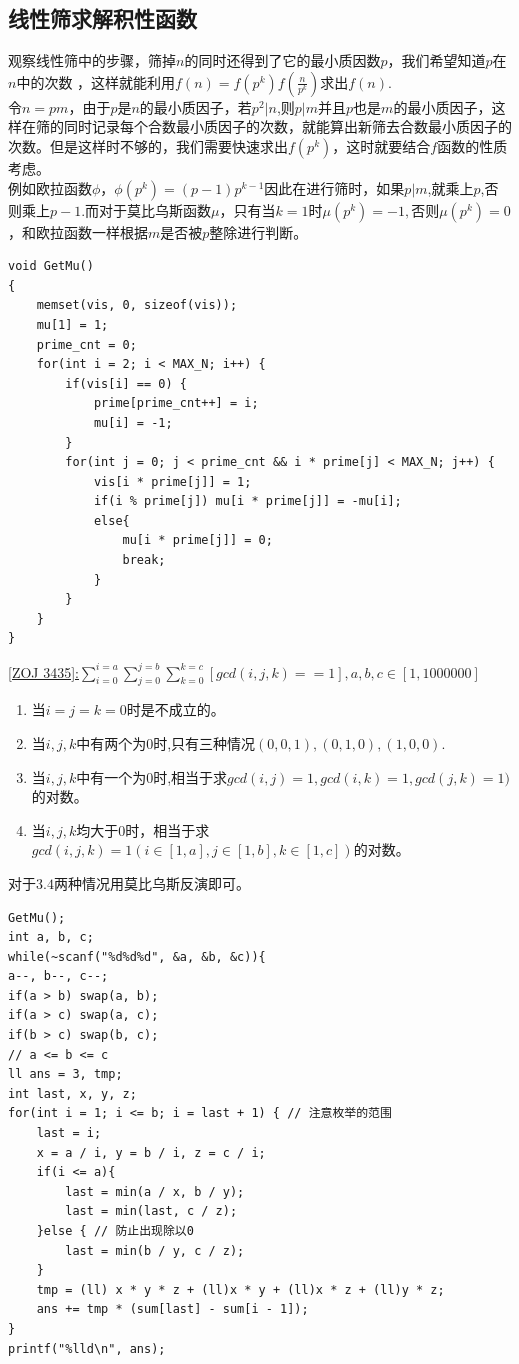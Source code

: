 \subsection{线性筛求解积性函数}
观察线性筛中的步骤，筛掉$n$的同时还得到了它的最小质因数$p$，我们希望知道$p$在$n$中的次数 ，这样就能利用$f(n) = f(p^k)f(\frac{n}{p^k})$求出$f(n)$. \\
令$n=pm$，由于$p$是$n$的最小质因子，若$p^2|n$,则$p|m$并且$p$也是$m$的最小质因子，这样在筛的同时记录每个合数最小质因子的次数，就能算出新筛去合数最小质因子的次数。但是这样时不够的，我们需要快速求出$f(p^k)$，这时就要结合$f$函数的性质考虑。\\
例如欧拉函数$\phi，\phi(p^k)=(p-1)p^{k-1}$因此在进行筛时，如果$p|m$,就乘上$p$,否则乘上$p-1$.而对于莫比乌斯函数$\mu$，只有当$k=1$时$\mu(p^k)=-1,否则\mu(p^k)=0$，和欧拉函数一样根据$m$是否被$p$整除进行判断。
\begin{lstlisting}
void GetMu()
{
	memset(vis, 0, sizeof(vis));
	mu[1] = 1;
	prime_cnt = 0;
	for(int i = 2; i < MAX_N; i++) {
		if(vis[i] == 0) {
			prime[prime_cnt++] = i;
			mu[i] = -1;
		}
		for(int j = 0; j < prime_cnt && i * prime[j] < MAX_N; j++) {
			vis[i * prime[j]] = 1;
			if(i % prime[j]) mu[i * prime[j]] = -mu[i];
			else{
				mu[i * prime[j]] = 0;
				break;
			}
		}	
	}
}
\end{lstlisting}

\underline {[ZOJ 3435]:$\sum_{i=0}^{i=a}\sum_{j=0}^{j=b}\sum_{k=0}^{k=c}[gcd(i,j,k)==1],a,b,c\in [1,1000000]$}

\begin{enumerate}
\item 当$i=j=k=0$时是不成立的。 \\
\item 当$i,j,k$中有两个为$0$时,只有三种情况$(0,0,1),(0,1,0),(1,0,0)$. \\
\item 当$i,j,k$中有一个为$0$时,相当于求$gcd(i,j)=1,gcd(i,k)=1,gcd(j,k)=1)$的对数。 \\
\item 当$i,j,k$均大于$0$时，相当于求$gcd(i,j,k)=1(i\in [1,a],j\in[1, b],k\in[1,c])$的对数。 \\
\end{enumerate}
对于$3.4$两种情况用莫比乌斯反演即可。 \\

\begin{lstlisting}
GetMu();
int a, b, c;
while(~scanf("%d%d%d", &a, &b, &c)){
a--, b--, c--;
if(a > b) swap(a, b);
if(a > c) swap(a, c);
if(b > c) swap(b, c);
// a <= b <= c
ll ans = 3, tmp;
int last, x, y, z;
for(int i = 1; i <= b; i = last + 1) { // 注意枚举的范围
	last = i;
	x = a / i, y = b / i, z = c / i;
	if(i <= a){
		last = min(a / x, b / y);
		last = min(last, c / z);
	}else { // 防止出现除以0
		last = min(b / y, c / z);
	}
	tmp = (ll) x * y * z + (ll)x * y + (ll)x * z + (ll)y * z;
	ans += tmp * (sum[last] - sum[i - 1]);
}
printf("%lld\n", ans);	
\end{lstlisting}

